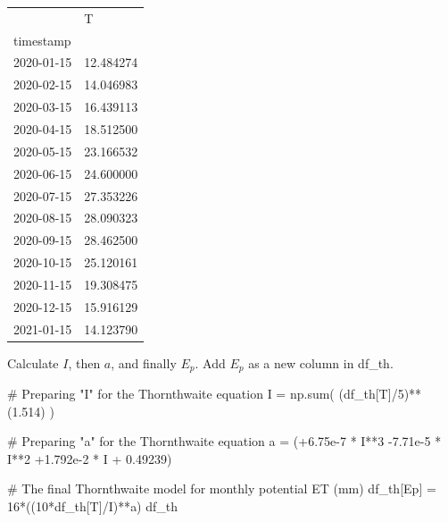 \documentclass[
  letterpaper,
  DIV=11,
  numbers=noendperiod]{scrreprt}
\newenvironment{Shaded}{\begin{snugshade}}{\end{snugshade}}
\newcommand{\BuiltInTok}[1]{\textcolor[rgb]{0.00,0.23,0.31}{#1}}
\newcommand{\CommentTok}[1]{\textcolor[rgb]{0.37,0.37,0.37}{#1}}
\newcommand{\DecValTok}[1]{\textcolor[rgb]{0.68,0.00,0.00}{#1}}
\newcommand{\FloatTok}[1]{\textcolor[rgb]{0.68,0.00,0.00}{#1}}
\newcommand{\NormalTok}[1]{\textcolor[rgb]{0.00,0.23,0.31}{#1}}
\newcommand{\OperatorTok}[1]{\textcolor[rgb]{0.37,0.37,0.37}{#1}}
\newcommand{\StringTok}[1]{\textcolor[rgb]{0.13,0.47,0.30}{#1}}
\begin{document}
\begin{longtable}[]{@{}ll@{}}
\toprule()
& T \\
timestamp & \\
\midrule()
\endhead
2020-01-15 & 12.484274 \\
2020-02-15 & 14.046983 \\
2020-03-15 & 16.439113 \\
2020-04-15 & 18.512500 \\
2020-05-15 & 23.166532 \\
2020-06-15 & 24.600000 \\
2020-07-15 & 27.353226 \\
2020-08-15 & 28.090323 \\
2020-09-15 & 28.462500 \\
2020-10-15 & 25.120161 \\
2020-11-15 & 19.308475 \\
2020-12-15 & 15.916129 \\
2021-01-15 & 14.123790 \\
\bottomrule()
\end{longtable}

Calculate \(I\), then \(a\), and finally \(E_p\). Add \(E_p\) as a new
column in df\_th.

\begin{Shaded}
\begin{Highlighting}[]
\CommentTok{\# Preparing "I" for the Thornthwaite equation}
\NormalTok{I }\OperatorTok{=}\NormalTok{ np.}\BuiltInTok{sum}\NormalTok{( (df\_th[}\StringTok{\textquotesingle{}T\textquotesingle{}}\NormalTok{]}\OperatorTok{/}\DecValTok{5}\NormalTok{)}\OperatorTok{**}\NormalTok{(}\FloatTok{1.514}\NormalTok{) )}

\CommentTok{\# Preparing "a" for the Thornthwaite equation}
\NormalTok{a }\OperatorTok{=}\NormalTok{ (}\OperatorTok{+}\FloatTok{6.75e{-}7} \OperatorTok{*}\NormalTok{ I}\OperatorTok{**}\DecValTok{3} 
     \OperatorTok{{-}}\FloatTok{7.71e{-}5} \OperatorTok{*}\NormalTok{ I}\OperatorTok{**}\DecValTok{2}
     \OperatorTok{+}\FloatTok{1.792e{-}2} \OperatorTok{*}\NormalTok{ I}
     \OperatorTok{+} \FloatTok{0.49239}\NormalTok{)}

\CommentTok{\# The final Thornthwaite model for monthly potential ET (mm)}
\NormalTok{df\_th[}\StringTok{\textquotesingle{}Ep\textquotesingle{}}\NormalTok{] }\OperatorTok{=} \DecValTok{16}\OperatorTok{*}\NormalTok{((}\DecValTok{10}\OperatorTok{*}\NormalTok{df\_th[}\StringTok{\textquotesingle{}T\textquotesingle{}}\NormalTok{]}\OperatorTok{/}\NormalTok{I)}\OperatorTok{**}\NormalTok{a)}
\NormalTok{df\_th}
\end{Highlighting}
\end{Shaded}
\end{document}
